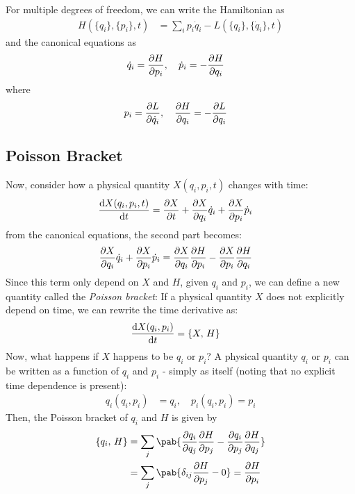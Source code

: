 For multiple degrees of freedom, we can write the Hamiltonian as
\begin{align}
  H(\{q_i\}, \{ p_i\}, t) & = \sum_i p_i \dot{q}_i - L(\{q_i\}, \{\dot{q}_i\}, t)
\end{align}
and the canonical equations as
\begin{align}
  \dot{q}_i & = \pdv{H}{p_i}, \quad \dot{p}_i = - \pdv{H}{q_i} \label{eq:hamilton-canonical-eq}
\end{align}
where
\begin{align}
  p_i & = \pdv{L}{\dot{q}_i}, \quad \pdv{H}{q_i} = - \pdv{L}{q_i}
\end{align}

\subsection{Poisson Bracket}
Now, consider how a physical quantity $X(q_i, p_i, t)$ changes with time:
\begin{align}
  \odv{X(q_i, p_i, t)}{t} & = \pdv{X}{t} + \pdv{X}{q_i} \dot{q}_i + \pdv{X}{p_i} \dot{p}_i
\end{align}
from the canonical equations, the second part becomes:
\begin{align}
  \pdv{X}{q_i} \dot{q}_i + \pdv{X}{p_i} \dot{p}_i & = \pdv{X}{q_i} \pdv{H}{p_i} - \pdv{X}{p_i} \pdv{H}{q_i}
\end{align}
Since this term only depend on $X$ and $H$, given $q_i$ and $p_i$, we can define a new quantity called the \emph{Poisson bracket}:
If a physical quantity $X$ does not explicitly depend on time, we can rewrite the time derivative as:
\begin{align}
  \odv{X(q_i, p_i)}{t} & = \pobra{X}{H}
\end{align}
Now, what happens if $X$ happens to be $q_i$ or $p_i$?
A physical quantity $q_i$ or $p_i$ can be written as a function of $q_i$ and $p_i$ - simply as itself (noting that no explicit time dependence is present):
\begin{align}
  q_i(q_i, p_i) & = q_i, \quad p_i(q_i, p_i) = p_i
\end{align}
Then, the Poisson bracket of $q_i$ and $H$ is given by
\begin{align}
  \pobra{q_i}{H} & = \sum_j \pab{\pdv{q_i}{q_j} \pdv{H}{p_j} - \pdv{q_i}{p_j} \pdv{H}{q_j}} \\
                 & = \sum_j \pab{\delta_{ij} \pdv{H}{p_j} - 0} = \pdv{H}{p_i}
\end{align}

